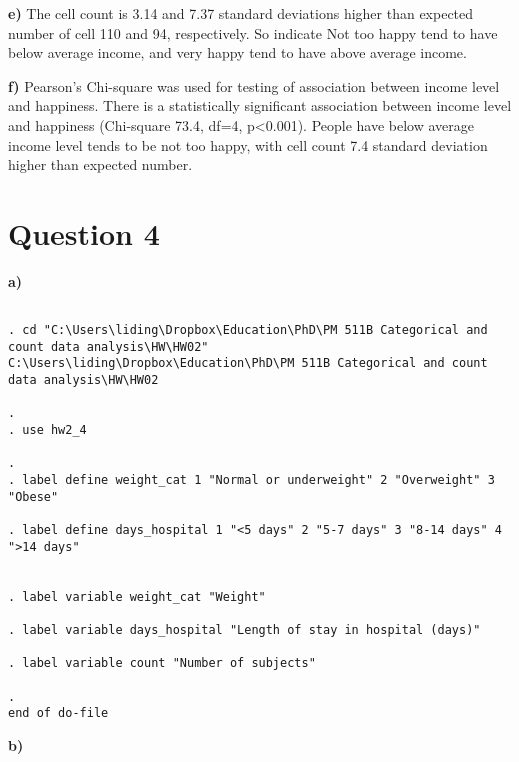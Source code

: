 \documentclass{article}
\begin{document}
\textbf{e)}
The cell count is 3.14 and 7.37 standard deviations higher than expected number of cell 110 and 94, respectively.
So indicate Not too happy tend to have below average income, and very happy tend to have above average income.

\textbf{f)}
Pearson's Chi-square was used for testing of association between income level and happiness. There is a statistically significant association between income level and happiness (Chi-square 73.4, df=4, p<0.001). People have below average income level tends to be not too happy, with cell count 7.4 standard deviation higher than expected number.

\section*{Question 4}

\textbf{a)}

\begin{verbatim}

. cd "C:\Users\liding\Dropbox\Education\PhD\PM 511B Categorical and count data analysis\HW\HW02"
C:\Users\liding\Dropbox\Education\PhD\PM 511B Categorical and count data analysis\HW\HW02

. 
. use hw2_4

.  
. label define weight_cat 1 "Normal or underweight" 2 "Overweight" 3 "Obese"

. label define days_hospital 1 "<5 days" 2 "5-7 days" 3 "8-14 days" 4 ">14 days"


. label variable weight_cat "Weight"

. label variable days_hospital "Length of stay in hospital (days)"

. label variable count "Number of subjects"

. 
end of do-file

\end{verbatim}

\textbf{b)}
\end{document}
